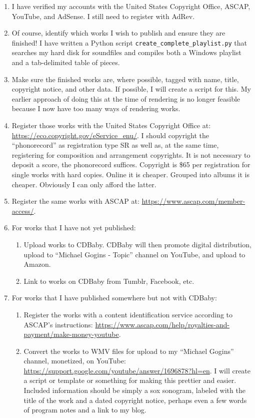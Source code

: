 \documentclass[english,11pt,letterpaper,onecolumn]{scrartcl}
\begin{document}
\begin{enumerate}
\item I have verified my accounts with the United States Copyright Office, ASCAP, YouTube, and AdSense. I still need to register with AdRev.
\item Of course, identify which works I wish to publish and ensure they are finished! I have written a Python script \texttt{create\_complete\_playlist.py} that searches my hard disk for soundfiles and compiles both a Windows playlist and a tab-delimited table of pieces.
\item Make sure the finished works are, where possible, tagged with name, title, copyright notice, and other data. If possible, I will create a script for this. My earlier approach of doing this at the time of rendering is no longer feasible because I now have too many ways of rendering works.
\item Register those works with the United States Copyright Office at: \url{https://eco.copyright.gov/eService_enu/}. I should copyright  the ``phonorecord'' as registration type SR as well as, at the same time, registering for composition and arrangement copyrights. It is not necessary to deposit a score, the phonorecord suffices. Copyright is \$65 per registration for single works with hard copies. Online it is cheaper. Grouped into albums it is cheaper. Obviously I can only afford the latter.
\item Register the same works with ASCAP at: \url{https://www.ascap.com/member-access/}. 
\item For works that I have not yet published:
\begin{enumerate}
	\item Upload works to CDBaby. CDBaby will then promote digital distribution, upload to ``Michael Gogins - Topic'' channel on YouTube, and upload to Amazon.
	\item Link to works on CDBaby from Tumblr, Facebook, etc.
\end{enumerate}
\item For works that I have published somewhere but not with CDBaby:
\begin{enumerate}
	\item Register the works with a content identification service according to ASCAP's instructions: \url{https://www.ascap.com/help/royalties-and-payment/make-money-youtube}. 
	\item Convert the works to WMV files for upload to my ``Michael Gogins'' channel, monetized, on YouTube: \url{https://support.google.com/youtube/answer/1696878?hl=en}. I will create a script or template or something for making this prettier and easier. Included information should be simply a sox sonogram, labeled with the title of the work and a dated copyright notice, perhaps even a few words of program notes and a link to my blog.
\end{enumerate}
\end{enumerate}
\end{document}
